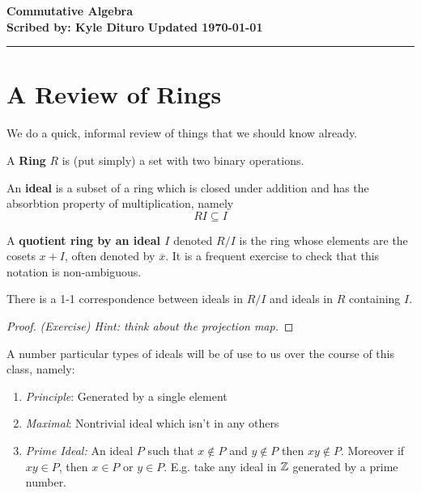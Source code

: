 \documentclass[12pt, twosided]{article}
\begin{document}
\noindent \textbf{Commutative Algebra} \hfill \textbf{} \\
\textbf{Scribed by: Kyle Dituro} \hfill \textbf{Updated \today}\hrule
\vspace{.2in}

\section{A Review of Rings}
We do a quick, informal review of things that we should know already.

\begin{df}
  A \textbf{Ring} \(R\) is (put simply) a set with two binary operations.
\end{df}

\begin{df}
  An \textbf{ideal} is a subset of a ring which is closed under addition and has the absorbtion property of multiplication, namely \[RI \subseteq I\]
\end{df}

\begin{df}
  A \textbf{quotient ring by an ideal \(I\)} denoted \(R/I\) is the ring whose elements are the cosets \(x + I\), often denoted by \(\overline{x}\). It is a frequent exercise to check that this notation is non-ambiguous.
\end{df}

\begin{prop}\label{Ex1}
  There is a 1-1 correspondence between ideals in \(R/I\) and ideals in \(R\) containing \(I\).
\end{prop}
\begin{proof}
  {\color{red} \textit{(Exercise) Hint: think about the projection map.}}
\end{proof}

A number particular types of ideals will be of use to us over the course of this class, namely:

\begin{enumerate}
\item \emph{Principle}: Generated by a single element
\item \emph{Maximal}: Nontrivial ideal which isn't in any others
\item \emph{Prime Ideal:} An ideal \(P\) such that \(x \not\in P\) and \(y \not\in P\) then \(xy \not\in P\). Moreover if \(xy \in P\), then \(x\in P\) or \(y \in P\). E.g. take any ideal in \(\mathbb{Z}\) generated by a prime number.
\end{enumerate}
\end{document}
